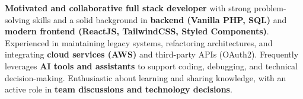 \documentclass[11pt, a4paper]{russell}
\begin{document}
    \makecvheader





    \begin{cvparagraph}
        \textbf{Motivated and collaborative full stack developer} with strong problem-solving skills and a solid background in \textbf{backend (Vanilla PHP, SQL)} and \textbf{modern frontend (ReactJS, TailwindCSS, Styled Components)}. Experienced in maintaining legacy systems, refactoring architectures, and integrating \textbf{cloud services (AWS)} and third-party APIs (OAuth2). Frequently leverages \textbf{AI tools and assistants} to support coding, debugging, and technical decision-making. Enthusiastic about learning and sharing knowledge, with an active role in \textbf{team discussions and technology decisions}.
    \end{cvparagraph}




    \begin{cvskills}
    \end{cvskills}



\end{document}
